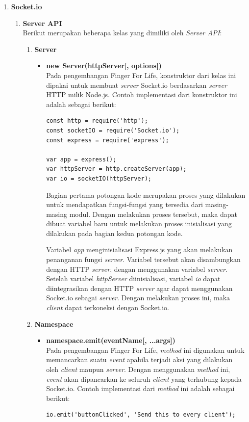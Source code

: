 \begin{enumerate}
	\item \textbf{Socket.io}
	\begin{enumerate}
		\item \textbf{Server API} \\
		Berikut merupakan beberapa kelas yang dimiliki oleh \textit{Server API}:
		\begin{enumerate}
			\item \textbf{Server}
			\begin{itemize}
				\item \textbf{new Server(httpServer[, options])} \\
				Pada pengembangan Finger For Life, konstruktor dari kelas ini dipakai untuk membuat \textit{server} Socket.io berdasarkan \textit{server} HTTP milik Node.js. Contoh implementasi dari konstruktor ini adalah sebagai berikut:
\begin{lstlisting}[caption={Implementasi konstruktor kelas \textit{Server}}]
const http = require('http');
const socketIO = require('Socket.io');
const express = require('express');

var app = express();
var httpServer = http.createServer(app);
var io = socketIO(httpServer);
\end{lstlisting}
				Bagian pertama potongan kode merupakan proses yang dilakukan untuk mendapatkan fungsi-fungsi yang tersedia dari masing-masing modul. Dengan melakukan proses tersebut, maka dapat dibuat variabel baru untuk melakukan proses inisialisasi yang dilakukan pada bagian kedua potongan kode.

				Variabel \textit{app} menginisialisasi Express.js yang akan melakukan penanganan fungsi \textit{server}. Variabel tersebut akan disambungkan dengan HTTP \textit{server}, dengan menggunakan variabel \textit{server}. Setelah variabel \textit{httpServer} diinisialisasi, variabel \textit{io} dapat diintegrasikan dengan HTTP \textit{server} agar dapat menggunakan Socket.io sebagai \textit{server}. Dengan melakukan proses ini, maka \textit{client} dapat terkoneksi dengan Socket.io.
				
			\end{itemize}
		
			\item \textbf{Namespace}
			\begin{itemize}
				\item \textbf{namespace.emit(eventName[, ...args])} \\
				Pada pengembangan Finger For Life, \textit{method} ini digunakan untuk memancarkan suatu \textit{event} apabila terjadi aksi yang dilakukan oleh \textit{client} maupun \textit{server}. Dengan menggunakan \textit{method} ini, \textit{event} akan dipancarkan ke seluruh \textit{client} yang terhubung kepada Socket.io. Contoh implementasi dari \textit{method} ini adalah sebagai berikut:
\begin{lstlisting}[caption={Implementasi \textit{method .emit()} }]
io.emit('buttonClicked', 'Send this to every client');
\end{lstlisting}


\end{itemize}
\end{enumerate}
\end{enumerate}
\end{enumerate}
